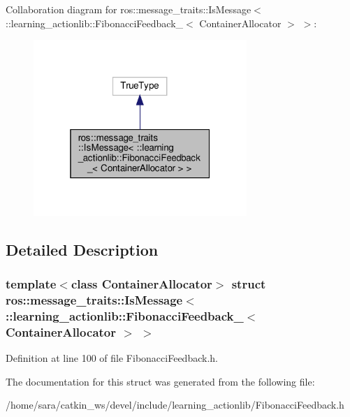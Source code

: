 Collaboration diagram for ros\+:\+:message\+\_\+traits\+:\+:Is\+Message$<$ \+:\+:learning\+\_\+actionlib\+:\+:Fibonacci\+Feedback\+\_\+$<$ Container\+Allocator $>$ $>$\+:
\nopagebreak
\begin{figure}[H]
\begin{center}
\leavevmode
\includegraphics[width=229pt]{structros_1_1message__traits_1_1IsMessage_3_01_1_1learning__actionlib_1_1FibonacciFeedback___3_060272f24cc5004bb09ee48fb2d2f8b8b}
\end{center}
\end{figure}


\subsection{Detailed Description}
\subsubsection*{template$<$class Container\+Allocator$>$\newline
struct ros\+::message\+\_\+traits\+::\+Is\+Message$<$ \+::learning\+\_\+actionlib\+::\+Fibonacci\+Feedback\+\_\+$<$ Container\+Allocator $>$ $>$}



Definition at line 100 of file Fibonacci\+Feedback.\+h.



The documentation for this struct was generated from the following file\+:\begin{DoxyCompactItemize}
\item 
/home/sara/catkin\+\_\+ws/devel/include/learning\+\_\+actionlib/Fibonacci\+Feedback.\+h\end{DoxyCompactItemize}
